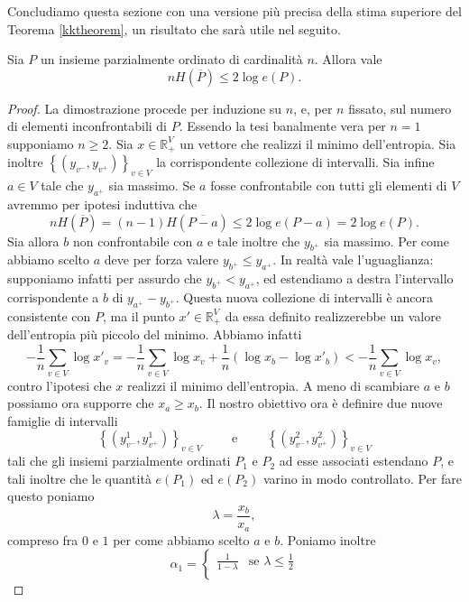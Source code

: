 Concludiamo questa sezione con una versione più precisa della stima superiore del Teorema \ref{kktheorem}, un risultato che sarà utile nel seguito. 
\begin{theorem}
	 \label{cfjjmtheorem} Sia \(P\) un insieme parzialmente ordinato di cardinalità \(n\). Allora vale
	\[nH\left(\overline{P}\right)\le 2\log{e(P)}.\]
\end{theorem}
\begin{proof}
	La dimostrazione procede per induzione su \(n\), e, per \(n\) fissato, sul numero di elementi inconfrontabili di \(P\). Essendo la tesi banalmente vera per \(n=1\) supponiamo \(n\ge 2\). Sia \(x\in \mathbb{R}_{+}^{V}\) un vettore che realizzi il minimo dell'entropia. Sia inoltre \(\left\{\left(y_{v^-},y_{v^+}\right)\right\}_{v\in V}\) la corrispondente collezione di intervalli. Sia infine \(a\in V\) tale che \(y_{a^+}\) sia massimo. Se \(a\) fosse confrontabile con tutti gli elementi di \(V\) avremmo per ipotesi induttiva che
	\[nH\left(\overline{P}\right)=(n-1)H\left(\overline{P-a}\right)\le 2\log{e(P-a)=2\log{e(P)}}.\]
	Sia allora \(b\) non confrontabile con \(a\) e tale inoltre che \(y_{b^+}\) sia massimo. Per come abbiamo scelto \(a\) deve per forza valere \(y_{b^+}\le y_{a^+}\). In realtà vale l'uguaglianza: supponiamo infatti per assurdo che \(y_{b^+}<y_{a^+}\), ed estendiamo a destra l'intervallo corrispondente a \(b\) di \(y_{a^+}-y_{b^+}\). Questa nuova collezione di intervalli è ancora consistente con \(P\), ma il punto \(x'\in \mathbb{R}_{+}^{V}\) da essa definito realizzerebbe un valore dell'entropia più piccolo del minimo. Abbiamo infatti
	\[-\frac{1}{n}\sum_{v\in V}{\log{x'_{v}}}=-\frac{1}{n}\sum_{v\in V}{\log{x_{v}}}+\frac{1}{n}\left(\log{x_b}-\log{x'_{b}}\right)<-\frac{1}{n}\sum_{v\in V}{\log{x_v}},\]
	contro l'ipotesi che \(x\) realizzi il minimo dell'entropia. A meno di scambiare \(a\) e \(b\) possiamo ora supporre che \(x_a\ge x_b\). Il nostro obiettivo ora è definire due nuove famiglie di intervalli
	\[\left\{\left(y_{v^-}^1, y_{v^+}^1\right)\right\}_{v\in V}\qquad\mbox{ e }\qquad\left\{\left(y_{v^-}^2, y_{v^+}^2\right)\right\}_{v\in V}\]
	tali che gli insiemi parzialmente ordinati \(P_1\) e \(P_2\) ad esse associati estendano \(P\), e tali inoltre che le quantità \(e(P_1)\) ed \(e(P_2)\) varino in modo controllato. Per fare questo poniamo
	\[\lambda=\frac{x_b}{x_a},\]
	compreso fra \(0\) e \(1\) per come abbiamo scelto \(a\) e \(b\). Poniamo inoltre
	\[\alpha_1= 
	\begin{cases}
		\frac{1}{1-\lambda} & \mbox{se } \lambda\le\frac{1}{2} \\

\end{cases}\]
\end{proof}

